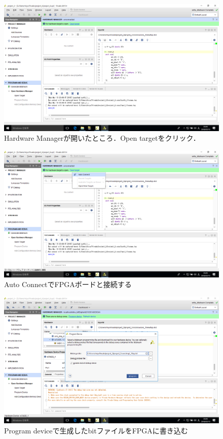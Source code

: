 \documentclass[a4paper,dvipdfmx]{jsarticle}
\begin{document}
 \begin{figure}[H]
  \begin{center}
   \includegraphics[width=.8\textwidth]{chapter08_figures/VirtualBox_Windows10_19_03_2018_23_45_17.png}
  \end{center}
  \caption{Hardware Managerが開いたところ．Open targetをクリック．}
 \end{figure}

 \begin{figure}[H]
  \begin{center}
   \includegraphics[width=.8\textwidth]{chapter08_figures/VirtualBox_Windows10_19_03_2018_23_45_23.png}
  \end{center}
  \caption{Auto ConnectでFPGAボードと接続する}
 \end{figure}

 \begin{figure}[H]
  \begin{center}
   \includegraphics[width=.8\textwidth]{chapter08_figures/VirtualBox_Windows10_19_03_2018_23_45_56.png}
  \end{center}
  \caption{Program deviceで生成したbitファイルをFPGAに書き込む}
 \end{figure}
\end{document}

